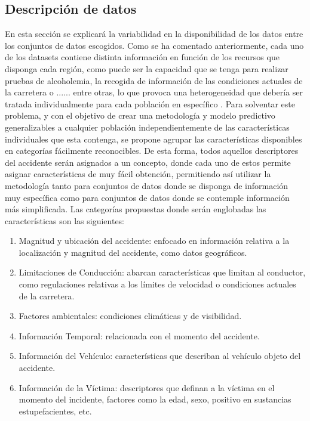 \documentclass{uathesis-es}
\begin{document}
{\subsection{Descripción de datos}

En esta sección se explicará la variabilidad en la disponibilidad de los datos entre los conjuntos de datos escogidos. Como se ha comentado anteriormente, cada uno de los datasets contiene distinta información en función de los recursos que disponga cada región, como puede ser la capacidad que se tenga para realizar pruebas de alcoholemia, la recogida de información de las condiciones actuales de la carretera o ...... entre otras, lo que provoca una heterogeneidad que debería ser tratada individualmente para cada población en específico . Para solventar este problema, y con el objetivo de crear una metodología y modelo predictivo generalizables a cualquier población independientemente de las características individuales que esta contenga, se propone agrupar las características disponibles en categorías fácilmente reconocibles. De esta forma, todos aquellos descriptores del accidente serán asignados a un concepto, donde cada uno de estos permite asignar características de muy fácil obtención, permitiendo así utilizar la metodología tanto para conjuntos de datos donde se disponga de información muy específica como para conjuntos de datos donde se contemple información más simplificada. Las categorías propuestas donde serán englobadas las características son las siguientes:

\begin{enumerate}
    \item Magnitud y ubicación del accidente: enfocado en información relativa a la localización y magnitud del accidente, como datos geográficos.
    \item Limitaciones de Conducción: abarcan características que limitan al conductor, como regulaciones relativas a los límites de velocidad o condiciones actuales de la carretera.
    \item Factores ambientales: condiciones climáticas y de visibilidad.
    \item Información Temporal: relacionada con el momento del accidente.
    \item Información del Vehículo: características que describan al vehículo objeto del accidente.
    \item Información de la Víctima: descriptores que definan a la víctima en el momento del incidente, factores como la edad, sexo, positivo en sustancias estupefacientes, etc.
\end{enumerate}

}
\end{document}
